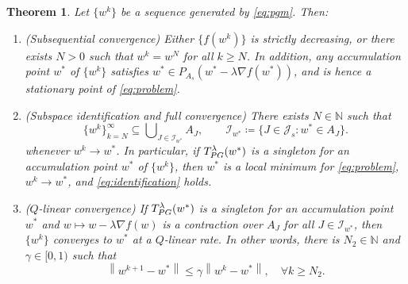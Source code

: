 \documentclass{article}
\newcommand{\alert}[1]{{#1}}
\theoremstyle{plain}
\newtheorem{theorem}{Theorem}[section]
\theoremstyle{definition}
\theoremstyle{remark}
\newcommand{\I}{\mathcal{I}}
\newcommand{\J}{\mathcal{J}}
\newcommand{\N}{\mathbb{N}}
\newcommand{\Tpg}{T_{\rm PG}^{\lambda}}
\newcommand{\norm}[1]{{\left\|{#1}\right\|}}
\begin{document}
\begin{theorem}
	\label{thm:pgm}
	\alert{Let $\{w ^k\}$ be a sequence 
	generated by \cref{eq:pgm}.}  Then:
	\begin{enumerate}[leftmargin=*]
		\item[(a)] (Subsequential convergence) %
			\alert{Either $\{f(w^k)\}$ is strictly decreasing, or there exists 
			$N>0$ 
			such that $w^k = w^N$ for all $k\geq N$. In addition,} any 
			accumulation point $w^*$ of $\{w^k\}$ satisfies
			$w^* \in P_{A_s} (w^* - \lambda \nabla f(w^*))$, and is
			hence a stationary point of \cref{eq:problem}.
		\item[(b)] (Subspace identification and full convergence) There 
		exists $N \in \N$ such that
		\begin{equation}
		\{w^k\}_{k=N}^{\infty}\subseteq \bigcup\nolimits
		_{J\in\I_{w^*}} A_J,\quad
		\quad \I_{w^*} \coloneqq \{ J\in \J_s: w^* \in
		A_J\}.
		\label{eq:identification}
		\end{equation} 
		whenever $w^k\to w^*$. In particular, if $\Tpg (w ^*)$ is a singleton 
		for an accumulation point $w^*$ of $\{w^k\}$, then
		$w^*$ is a local minimum for \cref{eq:problem}, $w ^k\to w ^*$, and 
			\cref{eq:identification} holds. 
	\item[(c)] ($Q$-linear convergence) If $\Tpg (w ^*)$ is a singleton 
	for an accumulation point $w^*$ and $w \mapsto w -
	\lambda \nabla f(w)$ is a contraction over $A_J$ for all $J\in
	\I_{w^*}$, then $\{w^k\}$ converges to $w^*$ at a $Q$-linear rate.
	In other words, there is $N_2 \in \N$ and $\gamma \in [0,1)$ such that
		\begin{equation}
		\label{eq:Q-linear}
		\norm{w^{k+1} - w^*} \leq \gamma \norm{w^{k} - w^*}, \quad \forall
		k \geq N_2.
		\end{equation}
	\end{enumerate}
\end{theorem}
\end{document}

